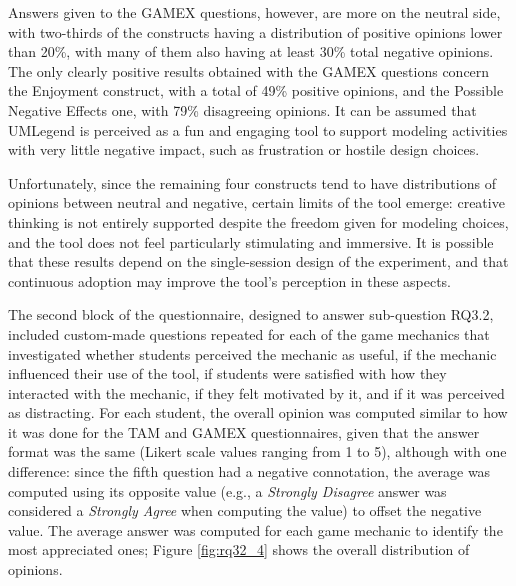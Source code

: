 Answers given to the GAMEX questions, however, are more on the neutral side, with two-thirds of the constructs having a distribution of positive opinions lower than 20\%, with many of them also having at least 30\% total negative opinions. The only clearly positive results obtained with the GAMEX questions concern the Enjoyment construct, with a total of 49\% positive opinions, and the Possible Negative Effects one, with 79\% disagreeing opinions. It can be assumed that UMLegend is perceived as a fun and engaging tool to support modeling activities with very little negative impact, such as frustration or hostile design choices.

Unfortunately, since the remaining four constructs tend to have distributions of opinions between neutral and negative, certain limits of the tool emerge: creative thinking is not entirely supported despite the freedom given for modeling choices, and the tool does not feel particularly stimulating and immersive. It is possible that these results depend on the single-session design of the experiment, and that continuous adoption may improve the tool's perception in these aspects.


The second block of the questionnaire, designed to answer sub-question RQ3.2, included custom-made questions repeated for each of the game mechanics that investigated whether students perceived the mechanic as useful, if the mechanic influenced their use of the tool, if students were satisfied with how they interacted with the mechanic, if they felt motivated by it, and if it was perceived as distracting. For each student, the overall opinion was computed similar to how it was done for the TAM and GAMEX questionnaires, given that the answer format was the same (Likert scale values ranging from 1 to 5), although with one difference: since the fifth question had a negative connotation, the average was computed using its opposite value (e.g., a \textit{Strongly Disagree} answer was considered a \textit{Strongly Agree} when computing the value) to offset the negative value. The average answer was computed for each game mechanic to identify the most appreciated ones; Figure \ref{fig:rq32_4} shows the overall distribution of opinions.

